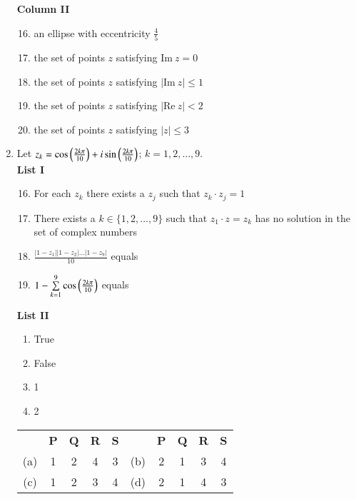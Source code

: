 \documentclass[journal,12pt,twocolumn]{IEEEtran}
\theoremstyle{remark}
\newcommand{\RE}{\mathrm{Re}}
\newcommand{\IM}{\mathrm{Im}}
\begin{document}
\begin{enumerate}[label=\arabic*)]
		\textbf{Column II}
		\begin{enumerate}[label=(\alph*)]
				\setcounter{enumii}{15}
			\item an ellipse with eccentricity $\frac 4 5$
			\item the set of points $z$ satisfying $\IM\ z = 0$
			\item the set of points $z$ satisfying $|\IM\ z| \le 1$
			\item the set of points $z$ satisfying $|\RE\ z| < 2$
			\item the set of points $z$ satisfying $|z| \le 3$
		\end{enumerate}

		\vspace{5mm}

	\item Let $z_k = \cos\left(\frac {2k\pi} {10}\right) + i\sin\left(\frac {2k\pi} {10}\right)$; $k = 1,2,\dots,9$.
		\hspace*{\fill} {\color{magenta}} \\

		\textbf{List I}
		\begin{enumerate}[label=\Alph*.]
				\setcounter{enumii}{15}
			\item For each $z_k$ there exists a $z_j$ such that $z_k \cdot z_j = 1$
			\item There exists a $k \in \{1,2,\dots, 9\}$ such that $z_1 \cdot z = z_k$ has no 
				solution in the set of complex numbers
			\item $\frac {|1 - z_1||1 - z_2|\dots|1-z_9|} {10}$ equals
			\item $1 - \sum\limits_{k=1}^9 \cos \left(\frac {2k\pi} {10}\right)$ equals
		\end{enumerate}

		\textbf{List II}
		\begin{enumerate}[label=\arabic*.]
			\item True
			\item False
			\item 1
			\item 2
		\end{enumerate}

		\begin{tabular}{c c c c c c c c c c}
			& \textbf P & \textbf Q & \textbf R & \textbf S & & \textbf P & \textbf Q & \textbf R & \textbf S \\
			(a) & 1 & 2 & 4 & 3 & (b) & 2 & 1 & 3 & 4 \\
			(c) & 1 & 2 & 3 & 4 & (d) & 2 & 1 & 4 & 3 \\
		\end{tabular}
\end{enumerate}
\end{document}
